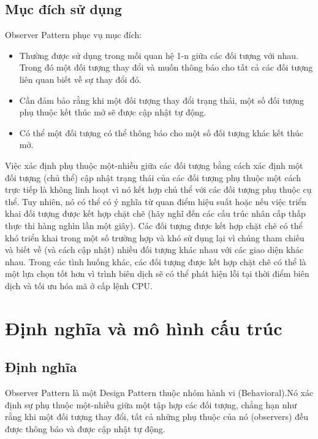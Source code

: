 \subsection{Mục đích sử dụng}
Observer Pattern phục vụ mục đích:
\begin{itemize}
    \item Thường được sử dụng trong mối quan hệ 1-n giữa các đối tượng với nhau. Trong đó một đối tượng thay đổi và muốn thông báo cho tất cả các đối tượng liên quan biết về sự thay đổi đó.
    \item Cần đảm bảo rằng khi một đối tượng thay đổi trạng thái, một số đối tượng phụ thuộc kết thúc mở sẽ được cập nhật tự động.
    \item Có thể một đối tượng có thể thông báo cho một số đối tượng khác kết thúc mở.
    
\end{itemize}
 Việc xác định phụ thuộc một-nhiều giữa các đối tượng bằng cách xác định một đối tượng (chủ thể) cập nhật trạng thái của các đối tượng phụ thuộc một cách trực tiếp là không linh hoạt vì nó kết hợp chủ thể với các đối tượng phụ thuộc cụ thể. Tuy nhiên, nó có thể có ý nghĩa từ quan điểm hiệu suất hoặc nếu việc triển khai đối tượng được kết hợp chặt chẽ (hãy nghĩ đến các cấu trúc nhân cấp thấp thực thi hàng nghìn lần một giây). Các đối tượng được kết hợp chặt chẽ có thể khó triển khai trong một số trường hợp và khó sử dụng lại vì chúng tham chiếu và biết về (và cách cập nhật) nhiều đối tượng khác nhau với các giao diện khác nhau. Trong các tình huống khác, các đối tượng được kết hợp chặt chẽ có thể là một lựa chọn tốt hơn vì trình biên dịch sẽ có thể phát hiện lỗi tại thời điểm biên dịch và tối ưu hóa mã ở cấp lệnh CPU.
 
\section{Định nghĩa và mô hình cấu trúc}
\subsection{Định nghĩa}
Observer Pattern là một Design Pattern thuộc nhóm hành vi (Behavioral).Nó xác định sự phụ thuộc một-nhiều giữa một tập hợp các đối tượng, chẳng hạn như rằng khi một đối tượng thay đổi, tất cả những phụ thuộc của nó (observers) đều được thông báo và được cập nhật tự động.
